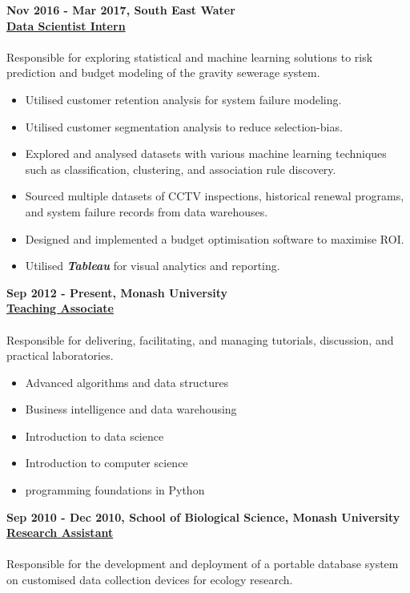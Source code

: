 \documentclass[a4paper,8pt,final]{memoir}
\newcommand{\Sep}{\vspace{1.5em}}
\newcommand{\CVItem}[1]
	{\textbf{\color{RoyalBlue} #1}}
\begin{document}
\CVItem{Nov 2016 - Mar 2017, South East Water}\\
\underline{\textbf{Data Scientist Intern}}\\
\\
Responsible for exploring statistical and machine learning solutions to risk prediction and budget modeling of the gravity sewerage system.
    \begin{itemize}
        \item Utilised customer retention analysis for system failure modeling.
        \item Utilised customer segmentation analysis to reduce selection-bias.
        \item Explored and analysed datasets with various machine learning techniques such as classification, clustering, and association rule discovery.
        \item Sourced multiple datasets of CCTV inspections, historical renewal programs, and system failure records from data warehouses.
        \item Designed and implemented a budget optimisation software to maximise ROI.
        \item Utilised \textit{\textbf{Tableau}} for visual analytics and reporting.
    \end{itemize}
\Sep

\clearpage
\framebreak
\framebreak

\CVItem{Sep 2012 - Present, Monash University}\\
\underline{\textbf{Teaching Associate}}\\
\\
Responsible for delivering, facilitating, and managing tutorials, discussion, and practical laboratories.
    \begin{itemize}
        \item Advanced algorithms and data structures
        \item Business intelligence and data warehousing
        \item Introduction to data science
        \item Introduction to computer science
        \item programming foundations in Python
    \end{itemize}
\Sep

\CVItem{Sep 2010 - Dec 2010, School of Biological Science, Monash University}\\
\underline{\textbf{Research Assistant}}\\
\\
Responsible for the development and deployment of a portable database system on customised data collection devices for ecology research.
\Sep
\end{document}
